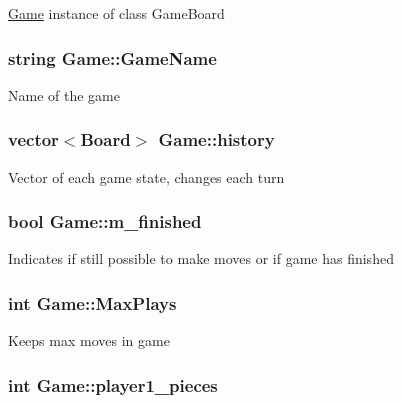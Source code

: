 \hyperlink{class_game}{Game} instance of class Game\-Board \hypertarget{class_game_a1b56d5db37d900da0911378cc01f4cad}{
\subsubsection[{Game\-Name}]{\setlength{\rightskip}{0pt plus 5cm}string Game\-::\-Game\-Name\hspace{0.3cm}{\ttfamily [protected]}}}\label{class_game_a1b56d5db37d900da0911378cc01f4cad}
Name of the game \hypertarget{class_game_a7c0dd74fa2e5c366638596b7e82428f1}{
\subsubsection[{history}]{\setlength{\rightskip}{0pt plus 5cm}vector$<${\bf Board}$>$ Game\-::history\hspace{0.3cm}{\ttfamily [protected]}}}\label{class_game_a7c0dd74fa2e5c366638596b7e82428f1}
Vector of each game state, changes each turn \hypertarget{class_game_aee0b70deb19422d35b2061beb339bdf8}{
\subsubsection[{m\-\_\-finished}]{\setlength{\rightskip}{0pt plus 5cm}bool Game\-::m\-\_\-finished}}\label{class_game_aee0b70deb19422d35b2061beb339bdf8}
Indicates if still possible to make moves or if game has finished \hypertarget{class_game_a53cb9be6604469db6b3abac24c5a2ab6}{
\subsubsection[{Max\-Plays}]{\setlength{\rightskip}{0pt plus 5cm}int Game\-::\-Max\-Plays\hspace{0.3cm}{\ttfamily [protected]}}}\label{class_game_a53cb9be6604469db6b3abac24c5a2ab6}
Keeps max moves in game \hypertarget{class_game_aea2c7f8bdb891f32026750c81f6eac16}{
\subsubsection[{player1\-\_\-pieces}]{\setlength{\rightskip}{0pt plus 5cm}int Game\-::player1\-\_\-pieces\hspace{0.3cm}{\ttfamily [protected]}}}\label{class_game_aea2c7f8bdb891f32026750c81f6eac16}

